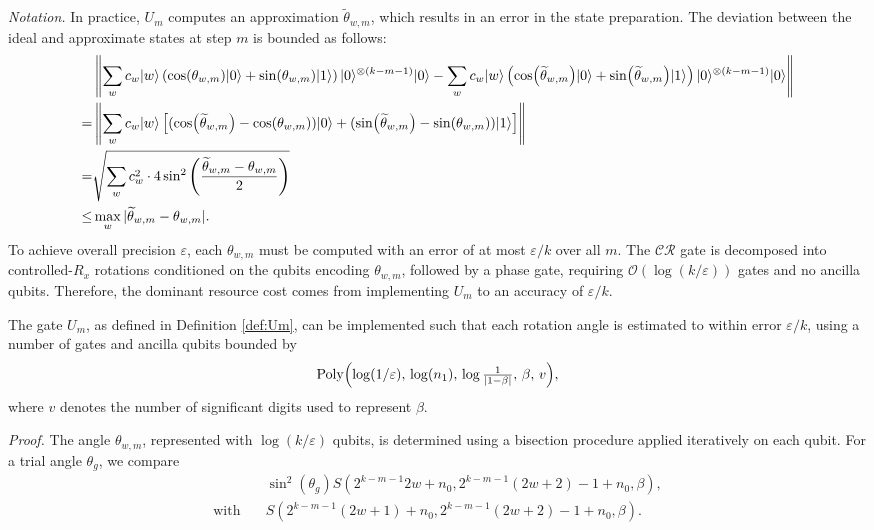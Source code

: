 \documentclass[aps,pra,twocolumn,superscriptaddress,preprintnumbers,amsmath,amssymb]{revtex4-2}
\begin{document}
\noindent\textit{Notation.} In practice, \(U_m\) computes an approximation \(\widetilde{\theta}_{w,m}\), which results in an error in the state preparation. The deviation between the ideal and approximate states at step $m$ is bounded as follows:
\begin{align}
&\left\| \sum_w c_w |w\rangle \left( \cos (\theta_{w,m}) |0\rangle + \sin (\theta_{w,m}) |1\rangle \right) |0\rangle^{\otimes (k-m-1)} |0\rangle - \sum_w c_w |w\rangle \left( \cos (\widetilde{\theta}_{w,m}) |0\rangle + \sin (\widetilde{\theta}_{w,m}) |1\rangle \right) |0\rangle^{\otimes (k-m-1)} |0\rangle \right\| \notag \\
=& \left\| \sum_w c_w |w\rangle \left[ ( \cos (\widetilde{\theta}_{w,m} )- \cos (\theta_{w,m}) ) |0\rangle + ( \sin (\widetilde{\theta}_{w,m}) - \sin (\theta_{w,m}) ) |1\rangle \right] \right\| \notag \\
=& \sqrt{\sum_w c_w^2 \cdot 4 \sin^2 \left( \frac{\widetilde{\theta}_{w,m} - \theta_{w,m}}{2} \right)} \notag \\
\leq & \max_w |\widetilde{\theta}_{w,m} - \theta_{w,m}|.
\end{align}
To achieve overall precision \(\varepsilon\), each \(\theta_{w,m}\) must be computed with an error of at most \(\varepsilon/k\) over all $m$. The \(\mathcal{CR}\) gate is decomposed into controlled-\(R_x\) rotations conditioned on the qubits encoding \(\theta_{w,m}\), followed by a phase gate, requiring \(\mathcal{O}(\log(k/\varepsilon))\) gates and no ancilla qubits. Therefore, the dominant resource cost comes from implementing $U_m$ to an accuracy of \(\varepsilon/k\).
\begin{theorem}\label{the:Um}
    The gate $U_m$, as defined in Definition \ref{def:Um}, can be implemented    such that each rotation angle is estimated to within error $\varepsilon/k$, using a number of gates and ancilla qubits bounded by
    \begin{equation}
    \mathrm{Poly}\Bigl(\log(1/\varepsilon),\,\log(n_1),\,\log\tfrac{1}{|1-\beta|},\,\beta,\,v\Bigr),
    \end{equation}
   where \( v \) denotes the number of significant digits used to represent \( \beta \).
\end{theorem}
\noindent\textit{Proof.} The angle \( \theta_{w,m} \), represented with \( \log(k/\varepsilon) \) qubits, is determined using a bisection procedure applied iteratively on each qubit. For a trial angle $\theta_g$, we compare
    \begin{align}
        &\sin^2(\theta_g)S(2^{k-m-1}2w+n_0,2^{k-m-1}(2w+2)-1+n_0,\beta), \label{eq:p1}\\
     \mathrm{with} \quad   &S(2^{k-m-1}(2w+1)+n_0,2^{k-m-1}(2w+2)-1+n_0,\beta). \label{eq:p2}
    \end{align} 
\end{document}
